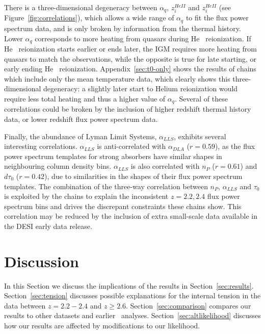 There is a three-dimensional degeneracy between $\alpha_q$, $z_i^{HeII}$ and $z_i^{HeII}$ (see Figure~\ref{fig:correlations}), which allows a wide range of $\alpha_q$ to fit the flux power spectrum data, and is only broken by information from the thermal history. Lower $\alpha_q$ corresponds to more heating from quasars during He~{} reionization. If He~{} reionization starts earlier or ends later, the IGM requires more heating from quasars to match the observations, while the opposite is true for late starting, or early ending He~{} reionization. Appendix~\ref{sec:t0-only} shows the results of chains which include only the mean temperature data, which clearly shows this three-dimensional degeneracy: a slightly later start to Helium reionization would require less total heating and thus a higher value of $\alpha_q$. 
Several of these correlations could be broken by the inclusion of higher redshift thermal history data, or lower redshift flux power spectrum data. 

Finally, the abundance of Lyman Limit Systems, $\alpha_{LLS}$, exhibits several interesting correlations. $\alpha_{LLS}$ is anti-correlated with $\alpha_{DLA}$ ($r=0.59$), as the flux power spectrum templates for strong absorbers have similar shapes in neighbouring column density bins. $\alpha_{LLS}$ is also correlated with $n_P$ ($r=0.61$) and $d\tau_0$ ($r=0.42$), due to similarities in the shapes of their flux power spectrum templates. The combination of the three-way correlation between $n_P$, $\alpha_{LLS}$ and $\tau_0$ is exploited by the chains to explain the inconsistent $z=2.2,2.4$ flux power spectrum bins and drives the discrepant constraints these chains show. This correlation may be reduced by the inclusion of extra small-scale data available in the DESI early data release.

\section{Discussion}
\label{sec:discussion}

In this Section we discuss the implications of the results in Section~\ref{sec:results}. 
Section~\ref{sec:tension} discusses possible explanations for the internal tension in the data between $z = 2.2 - 2.4$ and $z \geq 2.6$. Section~\ref{sec:comparison} compares our results to other datasets and earlier \Lya~analyses. Section~\ref{sec:altlikelihood} discusses how our results are affected by modifications to our likelihood.


